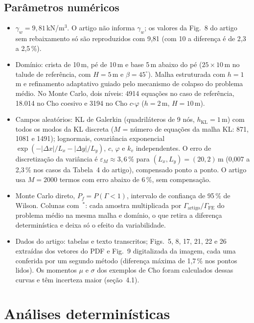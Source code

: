 \documentclass[11pt,a4paper]{article}
\newcommand{\Gam}{\Gamma}
\newcommand{\Gart}{\Gamma_{\mathrm{artigo}}}
\newcommand{\Gfe}{\Gamma_{\mathrm{FE}}}
\begin{document}
\subsection{Parâmetros numéricos}
\begin{itemize}
\item $\gamma_w = 9{,}81$\,kN/m$^3$. O artigo não informa $\gamma_w$; os valores da Fig.~8 do artigo sem
rebaixamento só são reproduzidos com 9,81 (com 10 a diferença é de 2,3 a 2,5\,\%).
\item Domínio: crista de 10\,m, pé de 10\,m e base 5\,m abaixo do pé ($25 \times 10$\,m no talude de referência, com
$H = 5$\,m e $\beta = 45^\circ$). Malha estruturada com $h = 1$\,m e refinamento adaptativo guiado pelo mecanismo de
colapso do problema médio. No Monte Carlo, dois níveis: 4914 equações no caso de referência, 18.014 no Cho coesivo
e 3194 no Cho $c$-$\varphi$ ($h = 2$\,m, $H = 10$\,m).
\item Campos aleatórios: KL de Galerkin (quadriláteros de 9 nós, $h_{\mathrm{KL}} = 1$\,m) com todos os modos da KL
discreta ($M$ = número de equações da malha KL: 871, 1081 e 1491); lognormais, covariância exponencial
$\exp(-|\Delta x|/L_x - |\Delta y|/L_y)$, $c$, $\varphi$ e $k_v$ independentes. O erro de discretização da variância
é $\varepsilon_M \approx 3{,}6\,\%$ para $(L_x, L_y) = (20, 2)$\,m (0,007 a 2,3\,\% nos casos da Tabela~4 do artigo),
compensado ponto a ponto. O artigo usa $M = 2000$ termos com erro abaixo de 6\,\%, sem compensação.
\item Monte Carlo direto, $P_f = P(\Gam < 1)$, intervalo de confiança de 95\,\% de Wilson. Colunas com~$^*$:
cada amostra multiplicada por $\Gart/\Gfe$ do problema médio na mesma malha e domínio, o que retira a diferença
determinística e deixa só o efeito da variabilidade.
\item Dados do artigo: tabelas e texto transcritos; Figs.~5, 8, 17, 21, 22 e 26 extraídas dos vetores do PDF e
Fig.~9 digitalizada da imagem, cada uma conferida por um segundo método (diferença máxima de 1,7\,\% nos pontos
lidos). Os momentos $\mu$ e $\sigma$ dos exemplos de Cho foram calculados dessas curvas e têm incerteza maior
(seção~4.1).
\end{itemize}

\section{Análises determinísticas}
\end{document}
